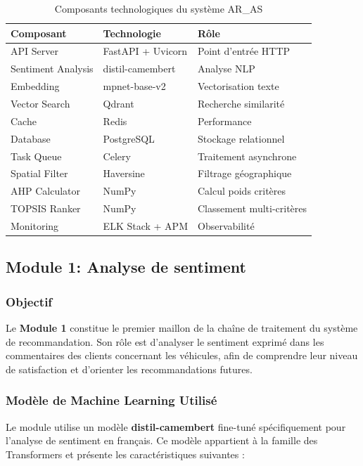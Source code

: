 \documentclass[11pt,a4paper]{report}
\begin{document}
\begin{table}[H]
    \centering
    \caption{Composants technologiques du système AR\_AS}
    \label{tab:composants_tech}
    \begin{tabular}{|l|l|l|}
        \hline
        \textbf{Composant} & \textbf{Technologie} & \textbf{Rôle} \\
        \hline
        API Server & FastAPI + Uvicorn & Point d'entrée HTTP \\
        Sentiment Analysis & distil-camembert & Analyse NLP \\
        Embedding & mpnet-base-v2 & Vectorisation texte \\
        Vector Search & Qdrant & Recherche similarité \\
        Cache & Redis & Performance \\
        Database & PostgreSQL & Stockage relationnel \\
        Task Queue & Celery & Traitement asynchrone \\
        Spatial Filter & Haversine & Filtrage géographique \\
        AHP Calculator & NumPy & Calcul poids critères \\
        TOPSIS Ranker & NumPy & Classement multi-critères \\
        Monitoring & ELK Stack + APM & Observabilité \\
        \hline
    \end{tabular}
\end{table}

\subsection{Module 1: Analyse de sentiment}
\label{subsec:module1_sentiment}

\subsubsection{Objectif}
Le \textbf{Module 1} constitue le premier maillon de la chaîne de traitement du système de recommandation. Son rôle est d'analyser le sentiment exprimé dans les commentaires des clients concernant les véhicules, afin de comprendre leur niveau de satisfaction et d'orienter les recommandations futures.

\subsubsection{Modèle de Machine Learning Utilisé}
Le module utilise un modèle \textbf{distil-camembert} fine-tuné spécifiquement pour l'analyse de sentiment en français. Ce modèle appartient à la famille des Transformers et présente les caractéristiques suivantes :
\end{document}

